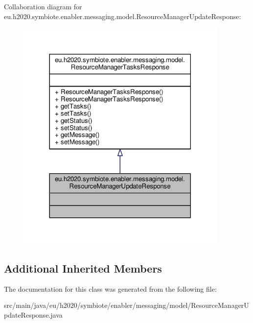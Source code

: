 Collaboration diagram for eu.\+h2020.\+symbiote.\+enabler.\+messaging.\+model.\+Resource\+Manager\+Update\+Response\+:
\nopagebreak
\begin{figure}[H]
\begin{center}
\leavevmode
\includegraphics[width=296pt]{classeu_1_1h2020_1_1symbiote_1_1enabler_1_1messaging_1_1model_1_1ResourceManagerUpdateResponse__coll__graph}
\end{center}
\end{figure}
\subsection*{Additional Inherited Members}


The documentation for this class was generated from the following file\+:\begin{DoxyCompactItemize}
\item 
src/main/java/eu/h2020/symbiote/enabler/messaging/model/Resource\+Manager\+Update\+Response.\+java\end{DoxyCompactItemize}
